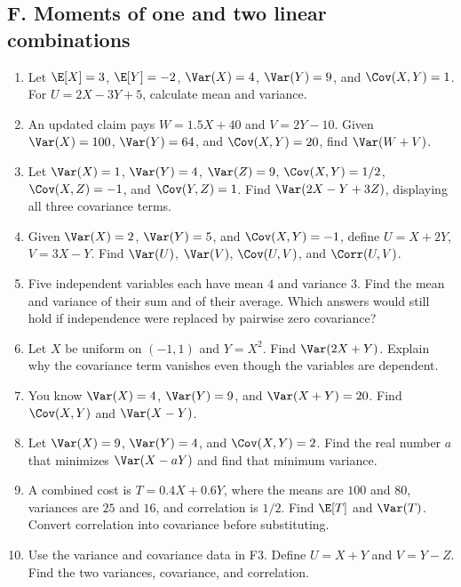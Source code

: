 \subsection{F. Moments of one and two linear combinations}
\begin{enumerate}[label=\textbf{F\arabic*.},leftmargin=*,itemsep=0.75em]
\item Let $\E[X]=3$, $\E[Y]=-2$, $\Var(X)=4$, $\Var(Y)=9$, and $\Cov(X,Y)=1$. For $U=2X-3Y+5$, calculate mean and variance.
\item An updated claim pays $W=1.5X+40$ and $V=2Y-10$. Given $\Var(X)=100$, $\Var(Y)=64$, and $\Cov(X,Y)=20$, find $\Var(W+V)$.
\item Let $\Var(X)=1$, $\Var(Y)=4$, $\Var(Z)=9$, $\Cov(X,Y)=1/2$, $\Cov(X,Z)=-1$, and $\Cov(Y,Z)=1$. Find $\Var(2X-Y+3Z)$, displaying all three covariance terms.
\item Given $\Var(X)=2$, $\Var(Y)=5$, and $\Cov(X,Y)=-1$, define $U=X+2Y$, $V=3X-Y$. Find $\Var(U)$, $\Var(V)$, $\Cov(U,V)$, and $\Corr(U,V)$.
\item Five independent variables each have mean $4$ and variance $3$. Find the mean and variance of their sum and of their average. Which answers would still hold if independence were replaced by pairwise zero covariance?
\item Let $X$ be uniform on $(-1,1)$ and $Y=X^2$. Find $\Var(2X+Y)$. Explain why the covariance term vanishes even though the variables are dependent.
\item You know $\Var(X)=4$, $\Var(Y)=9$, and $\Var(X+Y)=20$. Find $\Cov(X,Y)$ and $\Var(X-Y)$.
\item Let $\Var(X)=9$, $\Var(Y)=4$, and $\Cov(X,Y)=2$. Find the real number $a$ that minimizes $\Var(X-aY)$ and find that minimum variance.
\item A combined cost is $T=0.4X+0.6Y$, where the means are $100$ and $80$, variances are $25$ and $16$, and correlation is $1/2$. Find $\E[T]$ and $\Var(T)$. Convert correlation into covariance before substituting.
\item Use the variance and covariance data in F3. Define $U=X+Y$ and $V=Y-Z$. Find the two variances, covariance, and correlation.
\end{enumerate}

